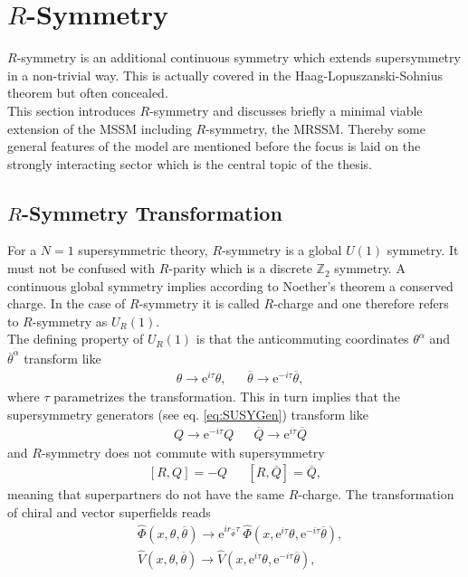 \section{$R$-Symmetry}
$R$-symmetry is an additional continuous symmetry which extends  supersymmetry in a non-trivial way. This is actually covered in the Haag-Lopuszanski-Sohnius theorem \cite{Haag:1974qh} but often concealed.\\
This section introduces $R$-symmetry and discusses briefly a minimal viable extension of the MSSM including $R$-symmetry, the MRSSM. Thereby some general features of the model are mentioned before the focus is laid on the strongly interacting sector which is the central topic of the thesis. 


\subsection{$R$-Symmetry Transformation}
For a $N=1$ supersymmetric theory, $R$-symmetry is a global $U(1)$ symmetry. It must not be confused with $R$-parity which is a discrete $\mathbb{Z}_2$ symmetry. A continuous global symmetry implies according to Noether's theorem a conserved charge. In the case of $R$-symmetry it is called $R$-charge and one therefore refers to $R$-symmetry as $U_R(1)$.\\
The defining property of $U_R(1)$ is that the anticommuting coordinates $\theta^\alpha$ and $\overline{\theta}^{\dot{\alpha}}$ transform like
\begin{align}
&\theta \to \mathrm{e}^{i\tau}\theta, && \overline{\theta} \to \mathrm{e}^{-i\tau}\overline{\theta},
\end{align}
where $\tau$ parametrizes the transformation. This in turn implies that the supersymmetry generators (see eq. \eqref{eq:SUSYGen}) transform like
\begin{align}
& Q \to \mathrm{e}^{-i\tau} Q && \overline{Q} \to \mathrm{e}^{i\tau}\overline{Q}
\end{align}
and $R$-symmetry does not commute with supersymmetry 
\begin{align}
\left[ R,Q \right] = -Q && \left[ R,\overline{Q} \right] = \overline{Q},
\end{align}
meaning that superpartners do not have the same $R$-charge. The transformation of chiral and vector superfields reads
\begin{align}
& \hat{\Phi}(x,\theta,\overline{\theta}) \to \mathrm{e}^{ir_{\hat{\Phi}}\tau}\ \hat{\Phi}(x,\mathrm{e}^{i\tau}\theta,\mathrm{e}^{-i\tau}\overline{\theta}),\nonumber\\
&\hat{V}(x,\theta,\overline{\theta}) \to  \hat{V}(x,\mathrm{e}^{i\tau}\theta,\mathrm{e}^{-i\tau}\overline{\theta}),
\end{align}
